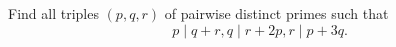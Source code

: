 Find all triples $(p,q,r)$ of pairwise distinct primes such that
\[p\mid q+r, q\mid r+2p, r\mid p+3q.\]